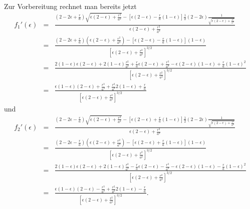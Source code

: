 \documentclass{book}
\begin{document}
%
Zur Vorbereitung rechnet man bereits jetzt
%
\begin{eqnarray}
f_1'\left(\epsilon\right) & = & \frac{\left(2 - 2\epsilon + \frac{r}{a}\right)\sqrt{\epsilon\left(2 - \epsilon\right) + \frac{r^2}{a^2}} - \left[\epsilon\left(2 - \epsilon\right) - \frac{r}{a}\left(1 - \epsilon\right)\right]\frac{1}{2}\left(2 - 2\epsilon\right)\frac{1}{\sqrt{\epsilon\left(2 - \epsilon\right) + \frac{r^2}{a^2}}}}{\epsilon\left(2 - \epsilon\right) + \frac{r^2}{a^2}}\nonumber\\
& = & \frac{\left(2 - 2\epsilon + \frac{r}{a}\right)\left(\epsilon\left(2 - \epsilon\right) + \frac{r^2}{a^2}\right) - \left[\epsilon\left(2 - \epsilon\right) - \frac{r}{a}\left(1 - \epsilon\right)\right]\left(1 - \epsilon\right)}{\left[\epsilon\left(2 - \epsilon\right) + \frac{r^2}{a^2}\right]^{3/2}}\nonumber\\
& = & \frac{2\left(1 - \epsilon\right)\epsilon\left(2 - \epsilon\right) + 2\left(1 - \epsilon\right)\frac{r^2}{a^2} + \frac{r}{a}\epsilon\left(2 - \epsilon\right) + \frac{r^3}{a^3} - \epsilon\left(2 - \epsilon\right)\left(1 - \epsilon\right) + \frac{r}{a}\left(1 - \epsilon\right)^2}{\left[\epsilon\left(2 - \epsilon\right) + \frac{r^2}{a^2}\right]^{3/2}}\nonumber\\
& = & \frac{\epsilon\left(1 - \epsilon\right)\left(2 - \epsilon\right) + \frac{r^3}{a^3} + \frac{r^2}{a^2}2\left(1 - \epsilon\right) + \frac{r}{a}}{\left[\epsilon\left(2 - \epsilon\right) + \frac{r^2}{a^2}\right]^{3/2}}
\end{eqnarray}
%
und
%
\begin{eqnarray}
f_2'\left(\epsilon\right) & = & \frac{\left(2 - 2\epsilon - \frac{r}{a}\right)\sqrt{\epsilon\left(2 - \epsilon\right) + \frac{r^2}{a^2}} - \left[\epsilon\left(2 - \epsilon\right) + \frac{r}{a}\left(1 - \epsilon\right)\right]\frac{1}{2}\left(2 - 2\epsilon\right)\frac{1}{\sqrt{\epsilon\left(2 - \epsilon\right) + \frac{r^2}{a^2}}}}{\epsilon\left(2 - \epsilon\right) + \frac{r^2}{a^2}}\nonumber\\
& = & \frac{\left(2 - 2\epsilon - \frac{r}{a}\right)\left(\epsilon\left(2 - \epsilon\right) + \frac{r^2}{a^2}\right) - \left[\epsilon\left(2 - \epsilon\right) + \frac{r}{a}\left(1 - \epsilon\right)\right]\left(1 - \epsilon\right)}{\left[\epsilon\left(2 - \epsilon\right) + \frac{r^2}{a^2}\right]^{3/2}}\nonumber\\
& = & \frac{2\left(1 - \epsilon\right)\epsilon\left(2 - \epsilon\right) + 2\left(1 - \epsilon\right)\frac{r^2}{a^2} - \frac{r}{a}\epsilon\left(2 - \epsilon\right) - \frac{r^3}{a^3} - \epsilon\left(2 - \epsilon\right)\left(1 - \epsilon\right) - \frac{r}{a}\left(1 - \epsilon\right)^2}{\left[\epsilon\left(2 - \epsilon\right) + \frac{r^2}{a^2}\right]^{3/2}}\nonumber\\
& = & \frac{\epsilon\left(1 - \epsilon\right)\left(2 - \epsilon\right) - \frac{r^3}{a^3} + \frac{r^2}{a^2}2\left(1 - \epsilon\right) - \frac{r}{a}}{\left[\epsilon\left(2 - \epsilon\right) + \frac{r^2}{a^2}\right]^{3/2}}.
\end{eqnarray}
\end{document}
